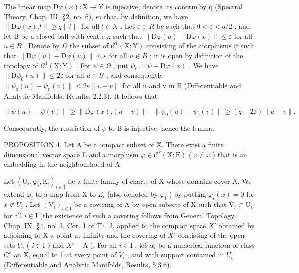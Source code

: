 The linear map \(\mathrm{D}\varphi(x):\mathrm{X}\to\mathrm{Y}\) is injective; denote its conorm by q (Spectral Theory, Chap. III, §2, no. 6), so that, by definition, we have \(\|\mathrm{D}\varphi(x).t\|\geq q\|t\|\) for all \(t\in X\) . Let \(\varepsilon\in R\) be such that \(0<\varepsilon<q/2\) , and let B be a closed ball with centre x such that \(\|\mathrm{D}\varphi(u)-\mathrm{D}\varphi(x)\|\leq\varepsilon\) for all \(u\in B\) . Denote by \(\Omega\) the subset of \(\mathcal{C}^{1}(\mathrm{X};\mathrm{Y})\) consisting of the morphisms \(\psi\) such that \(\|\mathrm{D}\psi(u)-\mathrm{D}\varphi(u)\|\leq\varepsilon\) for all \(u\in B\) ; it is open by definition of the topology of \(\mathcal{C}^{1}(\mathrm{X};\mathrm{Y})\) . For \(\psi\in\Omega\) , put \(\psi_{0}=\psi-\mathrm{D}\varphi(x)\) . We have \(\|\mathrm{D}\psi_{0}(u)\|\leq2\varepsilon\) for all \(u\in B\) , and consequently \(\|\psi_{0}(u)-\psi_{0}(v)\|\leq2\varepsilon\|u-v\|\) for all u and v in B (Differentiable and Analytic Manifolds, Results, 2.2.3). It follows that

\[
\| \psi (u) - \psi (v) \| \geq \| \mathrm{D} \varphi (x). (u - v) \| - \| \psi_ {0} (u) - \psi_ {0} (v) \| \geq (q - 2 \varepsilon) \| u - v \|.
\]

Consequently, the restriction of \(\psi\) to B is injective, hence the lemma.

PROPOSITION 4. Let A be a compact subset of X. There exist a finite dimensional vector space E and a morphism \(\varphi \in \mathcal{C}^r (\mathrm{X};\mathrm{E})\) ( \(r\neq \omega\) ) that is an embedding in the neighbourhood of A.

Let \((\mathrm{U}_{i},\varphi_{i},\mathrm{E}_{i})_{i\in\mathrm{I}}\) be a finite family of charts of X whose domains cover A. We extend \(\varphi_{i}\) to a map from X to \(E_{i}\) (also denoted by \(\varphi_{i}\) ) by putting \(\varphi_{i}(x)=0\) for \(x\notin U_{i}\) . Let \((\mathrm{V}_{i})_{i\in\mathrm{I}}\) be a covering of A by open subsets of X such that \(\overline{\mathrm{V}}_{i}\subset\mathrm{U}_{i}\) for all \(i\in\mathrm{I}\) (the existence of such a covering follows from General Topology, Chap. IX, §4, no. 3, Cor. 1 of Th. 3, applied to the compact space \(X'\) obtained by adjoining to X a point at infinity and the covering of \(X'\) consisting of the open sets \(U_{i}\) ( \(i\in\mathrm{I}\) ) and \(X'-\mathrm{A}\) ). For all \(i\in\mathrm{I}\) , let \(\alpha_{i}\) be a numerical function of class \(C^{r}\) on X, equal to 1 at every point of \(V_{i}\) , and with support contained in \(U_{i}\) (Differentiable and Analytic Manifolds, Results, 5.3.6).

